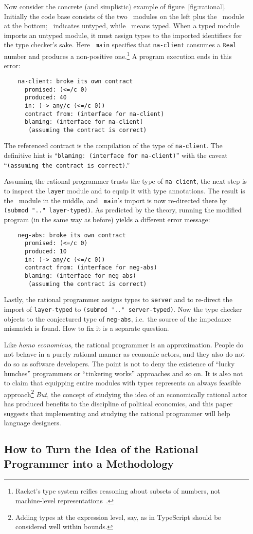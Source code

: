 Now consider the concrete (and simplistic) example of figure~\ref{fig:rational}.
Initially the code base consists of the two \dyncolor\ modules on the left plus
the \typecolor\ module at the bottom; \dyncolor\ indicates untyped, while
\typecolor\ means typed. When a typed module imports an untyped module, it must
assign types to the imported identifiers for the type checker's sake. Here {\tt
main} specifies that {\tt na-client} consumes a {\tt Real} number and produces a
non-positive one.\footnote{Racket's type system reifies
reasoning about subsets of numbers, not machine-level
representations~\citep{stathff-padl-12}.} A program execution ends in this error:
\begin{verbatim}
    na-client: broke its own contract
      promised: (<=/c 0)
      produced: 40
      in: (-> any/c (<=/c 0))           
      contract from: (interface for na-client)
      blaming: (interface for na-client)
       (assuming the contract is correct)
\end{verbatim}
The referenced contract is the compilation of the type of {\tt na-client}. The
definitive hint is ``{\tt blaming: (interface for na-client)}'' with the caveat
``{\tt (assuming the contract is correct)}.''

Assuming the rational programmer trusts the type of {\tt na-client}, the next
step is to inspect the {\tt layer} module and to equip it with type
annotations. The result is the \typecolor\ module in the middle, and {\tt
main}'s import is now re-directed there by {\tt (submod ".." layer-typed)}. As
predicted by the theory, running the modified program (in the same way as before) yields a different error message:
\begin{verbatim}
    neg-abs: broke its own contract
      promised: (<=/c 0)
      produced: 10
      in: (-> any/c (<=/c 0))
      contract from: (interface for neg-abs)
      blaming: (interface for neg-abs)
       (assuming the contract is correct)
\end{verbatim}
Lastly, the rational programmer assigns types to {\tt server} and to re-direct
the import of {\tt layer-typed} to {\tt (submod ".." server-typed)}. Now the
type checker objects to the conjectured type of {\tt neg-abs}, i.e.\ the source
of the impedance mismatch is found. How to fix it is a separate question.

Like {\it homo economicus\/}, the rational programmer is an approximation.
People do not behave in a purely rational manner as economic actors, and they
also do not do so as software developers. The point is not to deny the existence
of ``lucky hunches'' programmers or ``tinkering works'' approaches and so on. It
is also not to claim that equipping entire modules with types represents an
always feasible approach\footnote{Adding types at the expression level, say, as
in TypeScript should be considered well within bounds.}  {\em But\/}, the
concept of studying the idea of an economically rational actor has produced
benefits to the discipline of political economics, and this paper suggests that
implementing and studying the rational programmer will help language designers.

\subsection{How to Turn the Idea of the Rational Programmer into a Methodology} 
\label{sub:methodology}


